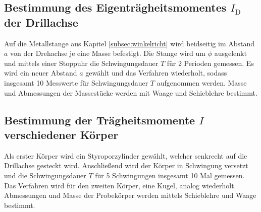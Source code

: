 \subsection{Bestimmung des Eigenträgheitsmomentes $I_{\mathup{D}}$ der Drillachse}
\label{subsec:eigentragheit}
Auf die Metallstange aus Kapitel \ref{subsec:winkelricht} wird beidseitig im Abstand $a$ von der Drehachse je eine Masse befestigt.
Die Stange wird um $\phi$ ausgelenkt und mittels einer Stoppuhr die Schwingungsdauer $T$ für 2 Perioden gemessen. 
Es wird ein neuer Abstand $a$ gewählt und das Verfahren wiederholt, sodass insgesamt 10 Messwerte für Schwingungsdauer $T$ aufgenommen werden.
Masse und Abmessungen der Massestücke werden mit Waage und Schieblehre bestimmt.

\subsection{Bestimmung der Trägheitsmomente $I$ verschiedener Körper}
\label{subsec:traegheitkoerper}
Als erster Körper wird ein Styroporzylinder gewählt, welcher senkrecht auf die Drillachse gesteckt wird.
Anschließend wird der Körper in Schwingung versetzt und die Schwingungsdauer $T$ für 5 Schwingungen insgesamt 10 Mal gemessen. 
Das Verfahren wird für den zweiten Körper, eine Kugel, analog wiederholt.
Abmessungen und Masse der Probekörper werden mittels Schieblehre und Waage bestimmt.
